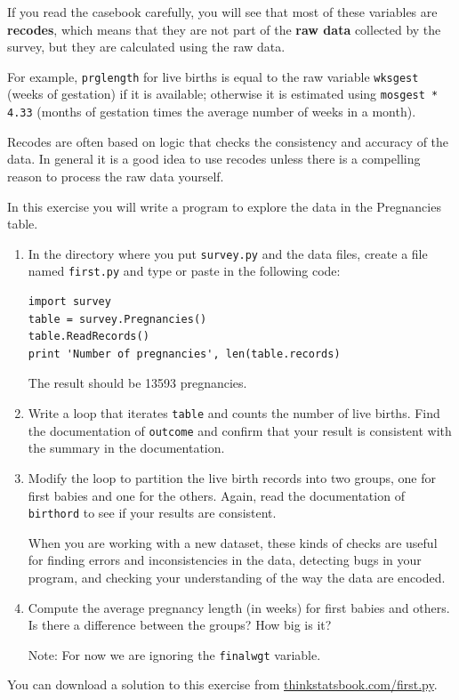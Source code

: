 \documentclass[12pt]{book}
\begin{document}
If you read the casebook carefully, you will see that most of these
variables are {\bf recodes}, which means that they are not part
of the {\bf raw data} collected by the survey, but they are
calculated using the raw data.

For example, {\tt prglength} for live births is equal to the raw
variable {\tt wksgest} (weeks of gestation) if it is available;
otherwise it is estimated using {\tt mosgest * 4.33} (months of
gestation times the average number of weeks in a month).

Recodes are often based on logic that checks the consistency and
accuracy of the data.  In general it is a good idea to use recodes
unless there is a compelling reason to process the raw data
yourself.

\begin{ex}

In this exercise you will write a program to explore the data
in the Pregnancies table.

\begin{enumerate}

\item In the directory where you put {\tt survey.py} and the
data files, create a file named \verb"first.py" and
type or paste in the following code:

\begin{verbatim}
import survey
table = survey.Pregnancies()
table.ReadRecords()
print 'Number of pregnancies', len(table.records)
\end{verbatim}

The result should be 13593 pregnancies.

\item Write a loop that iterates \verb"table" and counts
the number of live births.  Find the documentation of {\tt outcome}
and confirm that your result is consistent with the summary
in the documentation.

\item Modify the loop to partition the live birth records into
two groups, one for first babies and one for the others.  Again,
read the documentation of {\tt birthord} to see if your results
are consistent.

When you are working with a new dataset, these kinds of checks
are useful for finding errors and inconsistencies in the data,
detecting bugs in your program, and checking your understanding
of the way the data are encoded.

\item Compute the average pregnancy length (in weeks) for first
babies and others.  Is there a difference between the groups?  How
big is it?

Note: For now we are ignoring the {\tt finalwgt} variable.

\end{enumerate}

You can download a solution to this exercise from
\url{thinkstatsbook.com/first.py}.

\end{ex}
\end{document}
